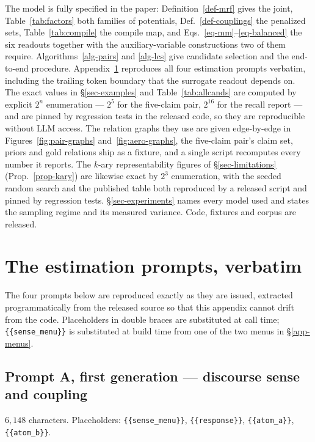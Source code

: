 The model is fully specified in the paper: Definition~\ref{def-mrf} gives the joint,
Table~\ref{tab:factors} both families of potentials, Def.~\ref{def-couplings} the penalized sets,
Table~\ref{tab:compile} the compile map, and Eqs.~\ref{eq-mm}--\ref{eq-balanced} the six readouts together
with the auxiliary-variable constructions two of them require. Algorithms~\ref{alg-pairs} and
\ref{alg-lcs} give candidate selection and the end-to-end procedure. Appendix~\ref{app-prompts}
reproduces all four estimation prompts verbatim, including the trailing token boundary that the
surrogate readout depends on. The exact values in \S\ref{sec-examples} and Table~\ref{tab:allcands} are
computed by explicit $2^n$ enumeration --- $2^5$ for the five-claim pair, $2^{16}$ for the recall
report --- and are pinned by regression tests in the released code, so they are reproducible without
LLM access. The relation graphs they use are given edge-by-edge in
Figures~\ref{fig:pair-graphs} and~\ref{fig:aero-graphs}, the five-claim pair's claim set, priors
and gold relations ship as a fixture, and a single script recomputes every number it reports. The
$k$-ary representability figures of \S\ref{sec-limitations} (Prop.~\ref{prop-kary}) are likewise
exact by $2^3$ enumeration, with the seeded random search and the published table both reproduced by
a released script and pinned by regression tests. \S\ref{sec-experiments} names every model used and states the sampling
regime and its measured variance. Code, fixtures and corpus are released.




\appendix

\section{The estimation prompts, verbatim}
\label{app-prompts}

The four prompts below are reproduced exactly as they are issued, extracted programmatically from the
released source so that this appendix cannot drift from the code. Placeholders in double braces are
substituted at call time; \verb|{{sense_menu}}| is substituted at build time from one of the two menus
in \S\ref{app-menus}.

\subsection{Prompt A, first generation --- discourse sense and coupling}
\label{app-prompt-a1}
$6{,}148$ characters. Placeholders: \verb|{{sense_menu}}|, \verb|{{response}}|, \verb|{{atom_a}}|,
\verb|{{atom_b}}|.

